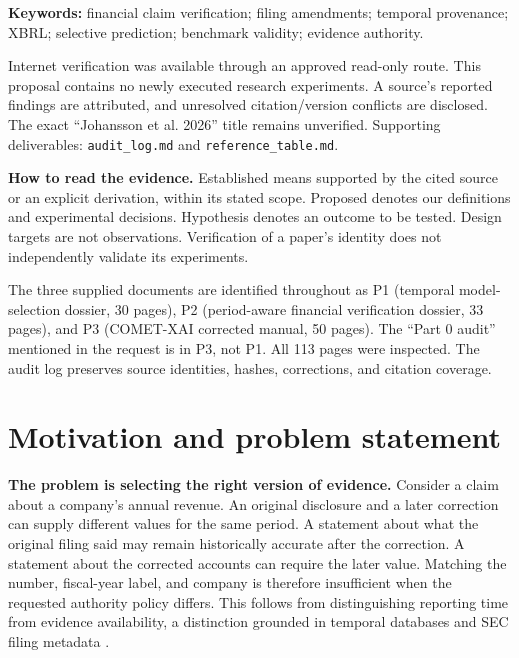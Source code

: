 \documentclass[11pt,a4paper]{article}
\newcommand{\pbreak}{\clearpage}
\newcommand{\lead}[1]{\textbf{\color{navy}#1}}
\newcommand{\status}[1]{\textsf{\color{teal}#1}}
\begin{document}
\lead{Keywords:} financial claim verification; filing amendments; temporal provenance; XBRL; selective prediction; benchmark validity; evidence authority.

\vfill
{\small\color{grey}Internet verification was available through an approved read-only route. This proposal contains no newly executed research experiments. A source's reported findings are attributed, and unresolved citation/version conflicts are disclosed. The exact “Johansson et al. 2026” title remains unverified. Supporting deliverables: \texttt{audit\_log.md} and \texttt{reference\_table.md}.\par}

\pbreak
\begingroup\small\setlength{\parskip}{0pt}\tableofcontents\endgroup
\vspace{5mm}
\begin{decisionbox}
\lead{How to read the evidence.} \status{Established} means supported by the cited source or an explicit derivation, within its stated scope. \status{Proposed} denotes our definitions and experimental decisions. \status{Hypothesis} denotes an outcome to be tested. Design targets are not observations. Verification of a paper's identity does not independently validate its experiments.
\end{decisionbox}
\small The three supplied documents are identified throughout as P1 (temporal model-selection dossier, 30 pages), P2 (period-aware financial verification dossier, 33 pages), and P3 (COMET-XAI corrected manual, 50 pages). The “Part 0 audit” mentioned in the request is in P3, not P1. All 113 pages were inspected. The audit log preserves source identities, hashes, corrections, and citation coverage.
\normalsize

\pbreak
\section{Motivation and problem statement}
\lead{The problem is selecting the right version of evidence.} Consider a claim about a company's annual revenue. An original disclosure and a later correction can supply different values for the same period. A statement about what the original filing said may remain historically accurate after the correction. A statement about the corrected accounts can require the later value. Matching the number, fiscal-year label, and company is therefore insufficient when the requested authority policy differs. This follows from distinguishing reporting time from evidence availability, a distinction grounded in temporal databases \cite{jensen} and SEC filing metadata \cite{sec}.
\end{document}
